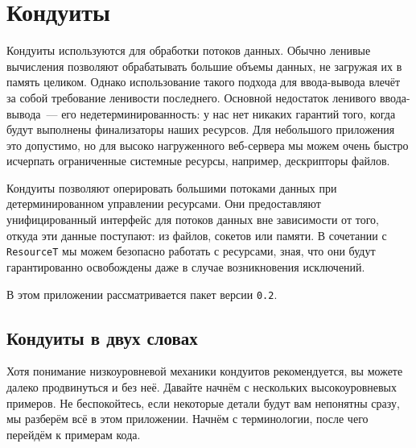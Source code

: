 \chapter{Кондуиты}\label{chap:conduit}

Кондуиты используются для обработки потоков данных. Обычно ленивые вычисления
позволяют обрабатывать большие объемы данных, не загружая их в память целиком. Однако
использование такого подхода для ввода-вывода влечёт за собой требование ленивости последнего.
Основной недостаток ленивого ввода-вывода~--- его недетерминированность: у нас нет никаких гарантий того, когда будут выполнены
финализаторы наших ресурсов. Для небольшого приложения это допустимо, но
для высоко нагруженного веб-сервера мы можем очень быстро исчерпать ограниченные системные ресурсы,
например, дескрипторы файлов.

Кондуиты позволяют оперировать большими потоками данных при детерминированном управлении
ресурсами. Они предоставляют унифицированный интерфейс для потоков данных вне зависимости
от того, откуда эти данные поступают: из файлов, сокетов или памяти. В сочетании с \lstinline{ResourceT} мы
можем безопасно работать с ресурсами, зная, что они будут гарантированно освобождены даже
в случае возникновения исключений.

В этом приложении рассматривается пакет
 версии \verb=0.2=.

\section{Кондуиты в двух словах}
Хотя понимание низкоуровневой механики кондуитов рекомендуется, вы можете далеко
продвинуться и без неё. Давайте начнём  с нескольких  высокоуровневых 	 примеров.  Не
беспокойтесь, если некоторые детали будут вам непонятны сразу,
  мы разберём всё в этом приложении. Начнём с терминологии, после чего перейдём к
примерам кода.

